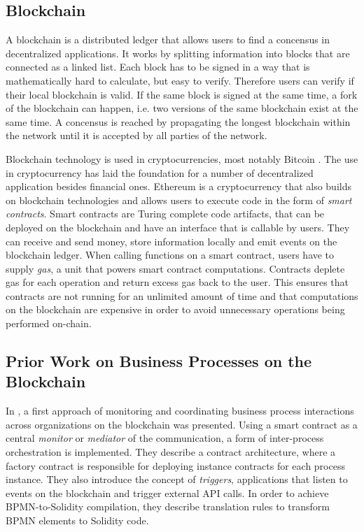 \documentclass[runningheads]{llncs}
\begin{document}
\subsection{Blockchain}
A blockchain is a distributed ledger that allows users to find a concensus in decentralized applications.
It works by splitting information into blocks that are connected as a linked list. 
Each block has to be signed in a way that is mathematically hard to calculate, but easy to verify.
Therefore users can verify if their local blockchain is valid.
If the same block is signed at the same time, a fork of the blockchain can happen, i.e. two versions of the same blockchain exist at the same time.
A concensus is reached by propagating the longest blockchain within the network until it is accepted by all parties of the network.

Blockchain technology is used in cryptocurrencies, most notably Bitcoin \cite{nakamoto2008bitcoin}.
The use in cryptocurrency has laid the foundation for a number of decentralized application besides financial ones.
Ethereum \cite{wood2014ethereum} is a cryptocurrency that also builds on blockchain technologies and allows users to execute code in the form of \emph{smart contracts}.
Smart contracts are Turing complete code artifacts, that can be deployed on the blockchain and have an interface that is callable by users. 
They can receive and send money, store information locally and emit events on the blockchain ledger.
When calling functions on a smart contract, users have to supply \emph{gas}, a unit that powers smart contract computations.
Contracts deplete gas for each operation and return excess gas back to the user.
This ensures that contracts are not running for an unlimited amount of time and that computations on the blockchain are expensive in order to avoid unnecessary operations being performed on-chain.

\subsection{Prior Work on Business Processes on the Blockchain}
In \cite{weber2016untrusted}, a first approach of monitoring and coordinating business process interactions across organizations on the blockchain was presented.
Using a smart contract as a central \emph{monitor} or \emph{mediator} of the communication, a form of inter-process orchestration is implemented.
They describe a contract architecture, where a factory contract is responsible for deploying instance contracts for each process instance.
They also introduce the concept of \emph{triggers}, applications that listen to events on the blockchain and trigger external API calls.
In order to achieve BPMN-to-Solidity compilation, they describe translation rules to transform BPMN elements to Solidity code.
\end{document}
